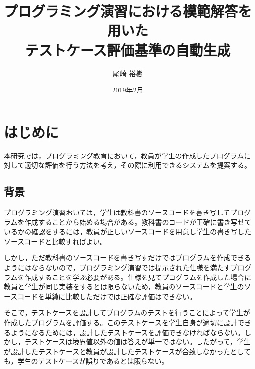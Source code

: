 \documentclass{tpu-sotu}
\author{尾崎 裕樹}
\title{プログラミング演習における模範解答を用いた\\テストケース評価基準の自動生成}
\date{2019年2月}
\begin{document}
%
\maketitle
\clearpage
{}
\tableofcontents
\clearpage
{}
%

%
\chapter{はじめに}
本研究では，プログラミング教育において，教員が学生の作成したプログラムに対して適切な評価を行う方法を考え，その際に利用できるシステムを提案する。
\section{背景}
プログラミング演習おいては，学生は教科書のソースコードを書き写してプログラムを作成することから始める場合がある。教科書のコードが正確に書き写せているかの確認をするには，教員が正しいソースコードを用意し学生の書き写したソースコードと比較すればよい。

しかし，ただ教科書のソースコードを書き写すだけではプログラムを作成できるようにはならないので，プログラミング演習では提示された仕様を満たすプログラムを作成することを学ぶ必要がある。仕様を見てプログラムを作成した場合に教員と学生が同じ実装をするとは限らないため，教員のソースコードと学生のソースコードを単純に比較しただけでは正確な評価はできない。

そこで，テストケースを設計してプログラムのテストを行うことによって学生が作成したプログラムを評価する。このテストケースを学生自身が適切に設計できるようになるためには，設計したテストケースを評価できなければならない。しかし，テストケースは境界値以外の値は答えが単一ではない。したがって，学生が設計したテストケースと教員が設計したテストケースが合致しなかったとしても，学生のテストケースが誤りであるとは限らない。
\end{document}
